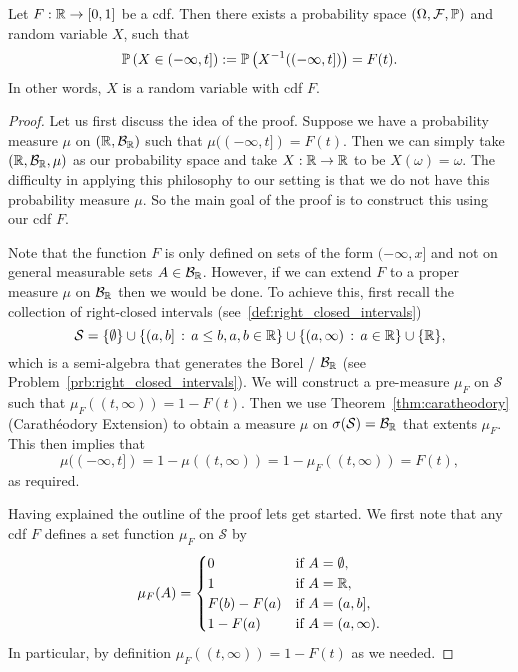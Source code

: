 \begin{theorem}\label{thm:construction_random_variable}
Let $F : \mathbb R \to [0,1]$ be a cdf. Then there exists a probability space  $(\Omega,\mathcal F, \mathbb P)$ and random variable $X$, such that 
\[
	\mathbb P\left(X \in (-\infty,t]\right) := \mathbb P\left(X^{-1}((-\infty,t])\right) = F(t).
\]
In other words, $X$ is a random variable with cdf $F$.
\end{theorem}

\begin{proof}

Let us first discuss the idea of the proof. Suppose we have a probability measure $\mu$ on $(\mathbb R, \mathcal B_{\mathbb R})$ such that $\mu((-\infty,t]) = F(t)$. Then we can simply take $(\mathbb R, \mathcal B_{\mathbb R}, \mu)$ as our probability space and take $X : \mathbb R \to \mathbb R$ to be $X(\omega) = \omega$. The difficulty in applying this philosophy to our setting is that we do not have this probability measure $\mu$. So the main goal of the proof is to construct this using our cdf $F$. 

Note that the function $F$ is only defined on sets of the form $(-\infty,x]$ and not on general measurable sets $A \in \mathcal B_{\mathbb R}$. However, if we can extend $F$ to a proper measure $\mu$ on $\mathcal B_{\mathbb R}$ then we would be done. To achieve this, first recall the collection of right-closed intervals (see~\eqref{def:right_closed_intervals})
\[
	\mathcal{S} = \{\emptyset\} \cup \{(a,b] \, : \, a \le b, a,b \in \mathbb R\} \cup \{(a, \infty) \, : \, a \in \mathbb R\} \cup \{\mathbb R\},
\] 
which is a semi-algebra that generates the Borel \sigalg/ $\mathcal B_{\mathbb R}$ (see Problem~\ref{prb:right_closed_intervals}). We will construct a pre-measure $\mu_F$ on $\mathcal{S}$ such that $\mu_F((t,\infty)) = 1 - F(t)$. Then we use Theorem~\ref{thm:caratheodory} (Carath\'{e}odory Extension) to obtain a measure $\mu$ on $\sigma(\mathcal{S}) = \mathcal B_{\mathbb R}$ that extents $\mu_F$. This then implies that 
\[
	\mu((-\infty,t]) = 1 - \mu((t,\infty)) = 1 - \mu_F((t,\infty)) = F(t),
\]
as required. 

Having explained the outline of the proof lets get started. We first note that any cdf $F$ defines a set function $\mu_F$ on $\mathcal{S}$ by
\[
	\mu_F(A) = \begin{cases}
		0 &\text{if } A = \emptyset,\\
		1 &\text{if } A = \mathbb R,\\
		F(b) - F(a) &\text{if } A = (a,b],\\
		1 - F(a) &\text{if } A = (a, \infty).
	\end{cases}
\]
In particular, by definition $\mu_F((t,\infty)) = 1 - F(t)$ as we needed.


\end{proof}
